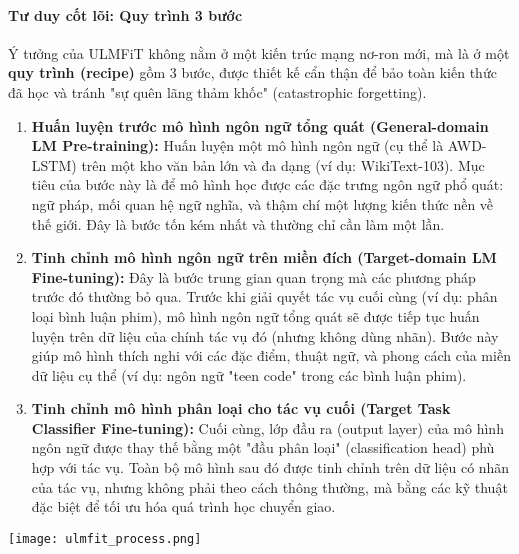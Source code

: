 \paragraph{Tư duy cốt lõi: Quy trình 3 bước}
Ý tưởng của ULMFiT không nằm ở một kiến trúc mạng nơ-ron mới, mà là ở một \textbf{quy trình (recipe)} gồm 3 bước, được thiết kế cẩn thận để bảo toàn kiến thức đã học và tránh "sự quên lãng thảm khốc" (catastrophic forgetting).

\begin{enumerate}
    \item \textbf{Huấn luyện trước mô hình ngôn ngữ tổng quát (General-domain LM Pre-training):} Huấn luyện một mô hình ngôn ngữ (cụ thể là AWD-LSTM) trên một kho văn bản lớn và đa dạng (ví dụ: WikiText-103). Mục tiêu của bước này là để mô hình học được các đặc trưng ngôn ngữ phổ quát: ngữ pháp, mối quan hệ ngữ nghĩa, và thậm chí một lượng kiến thức nền về thế giới. Đây là bước tốn kém nhất và thường chỉ cần làm một lần.

    \item \textbf{Tinh chỉnh mô hình ngôn ngữ trên miền đích (Target-domain LM Fine-tuning):} Đây là bước trung gian quan trọng mà các phương pháp trước đó thường bỏ qua. Trước khi giải quyết tác vụ cuối cùng (ví dụ: phân loại bình luận phim), mô hình ngôn ngữ tổng quát sẽ được tiếp tục huấn luyện trên dữ liệu của chính tác vụ đó (nhưng không dùng nhãn). Bước này giúp mô hình thích nghi với các đặc điểm, thuật ngữ, và phong cách của miền dữ liệu cụ thể (ví dụ: ngôn ngữ "teen code" trong các bình luận phim).

    \item \textbf{Tinh chỉnh mô hình phân loại cho tác vụ cuối (Target Task Classifier Fine-tuning):} Cuối cùng, lớp đầu ra (output layer) của mô hình ngôn ngữ được thay thế bằng một "đầu phân loại" (classification head) phù hợp với tác vụ. Toàn bộ mô hình sau đó được tinh chỉnh trên dữ liệu có nhãn của tác vụ, nhưng không phải theo cách thông thường, mà bằng các kỹ thuật đặc biệt để tối ưu hóa quá trình học chuyển giao.
\end{enumerate}

\begin{center}
    \texttt{[image: ulmfit\_process.png]}
    \label{fig:ulmfit_process}
\end{center}

